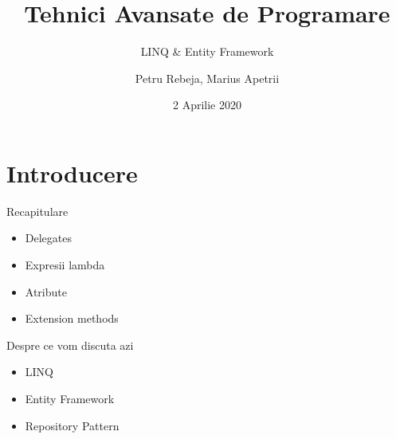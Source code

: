 \documentclass[presentation]{beamer}
\author{Petru Rebeja, Marius Apetrii}
\date{2 Aprilie 2020}
\title{Tehnici Avansate de Programare}
\subtitle{LINQ \& Entity Framework}
\institute[UAIC]{Facultatea de Matematică\\Universitatea Alexandru Ioan Cuza, Iași}
\begin{document}
\maketitle
\section{Introducere}
\label{sec:org038061f}
\begin{frame}[label={sec:orgda70782}]{Recapitulare}
\begin{itemize}
\item Delegates
\item Expresii lambda
\item Atribute
\item Extension methods
\end{itemize}
\end{frame}
\begin{frame}[label={sec:orge6482d0}]{Despre ce vom discuta azi}
\begin{itemize}
\item LINQ
\item Entity Framework
\item Repository Pattern
\end{itemize}
\end{frame}
\end{document}
